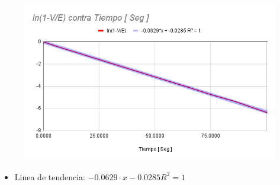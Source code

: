 \documentclass[twocolumn, 12pt]{article}
\begin{document}
\begin{figure}[H]
    \centering
    \includegraphics[width=\linewidth]{./Images/ln(1-V_E) contra Tiempo [ Seg ].png}
\end{figure}

\begin{itemize}[label=$\triangleright$]
    \item Linea de tendencia:\hfill \break{} $-0.0629 \cdot x -0.0285
              R^2 = 1$
\end{itemize}
\end{document}
